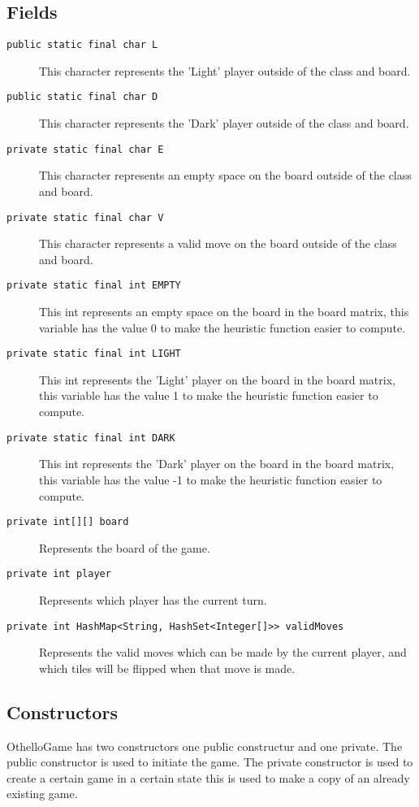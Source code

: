 \documentclass[a4paper]{article}
\begin{document}
\subsection{Fields}
\begin{description}
\item[\texttt{public static final char L}] This character represents the 'Light' player outside of the class and board.
\item[\texttt{public static final char D}] This character represents the 'Dark' player outside of the class and board.
\item[\texttt{private static final char E}] This character represents an empty space on the board outside of the class and board.
\item[\texttt{private static final char V}] This character represents a valid move on the board outside of the class and board.
\item[\texttt{private static final int EMPTY}] This int represents an empty space on the board in the board matrix, this variable has the value 0 to make the heuristic function easier to compute. 
\item[\texttt{private static final int LIGHT}] This int represents the 'Light' player on the board in the board matrix, this variable has the value 1 to make the heuristic function easier to compute. 
\item[\texttt{private static final int DARK}] This int represents the 'Dark' player on the board in the board matrix, this variable has the value -1 to make the heuristic function easier to compute. 
\item[\texttt{private int[][] board}] Represents the board of the game.
\item[\texttt{private int player}] Represents which player has the current turn.
\item[\texttt{private int HashMap<String, HashSet<Integer[]>> validMoves}] Represents the valid moves which can be made by the current player, and which tiles will be flipped when that move is made.
\end{description} 
\subsection{Constructors}
OthelloGame has two constructors one public constructur and one private. The public constructor is used to initiate the game. The private constructor is used to create a certain game in a certain state this is used to make a copy of an already existing game.
\end{document}
